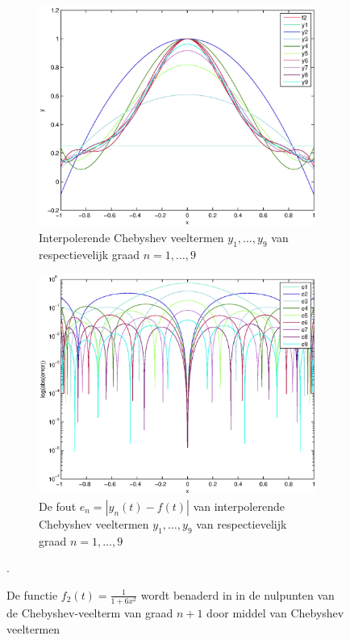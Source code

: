 \documentclass[a4paper]{article}
\begin{document}
\begin{figure}
    \centering
    \begin{subfigure}[b]{\textwidth}
        \centering
        \includegraphics[width=\textwidth]{Jona/cheby_f2_interpolation.eps}
        \caption{Interpolerende Chebyshev veeltermen $y_{1},\dots,y_{9}$ van respectievelijk graad $n=1,\dots,9$}
        \label{fig:cheb_f2_interpol}
        \vspace*{1cm}
    \end{subfigure}
    \begin{subfigure}[b]{\textwidth}
        \centering
        \includegraphics[width=\textwidth]{Jona/cheby_f2_error.eps}
        \caption{De fout $e_{n} = |y_{n}(t)-f(t)|$ van interpolerende Chebyshev veeltermen $y_{1},\dots,y_{9}$ van respectievelijk graad $n=1,\dots,9$}
        \label{fig:cheb_f2_error}
        \vspace*{1cm}
    \end{subfigure}
    \hfill
    \caption{De functie $f_{2}(t) = \frac{1}{1+6x^{2}}$ wordt benaderd in in de nulpunten van de Chebyshev-veelterm van graad $n+1$ door middel van Chebyshev veeltermen}\label{fig:cheb_f2}.
\end{figure}
\end{document}
